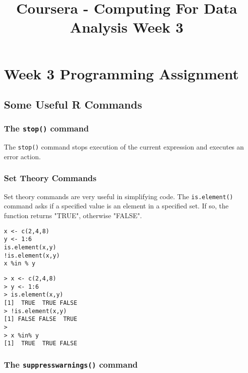 \documentclass[]{article}
\title{Coursera - Computing For Data Analysis Week 3}
\begin{document}
\maketitle



\section{Week 3 Programming Assignment}
\subsection{Some Useful R Commands}

\subsubsection{The \texttt{stop()} command}
The \texttt{stop()} command stops execution of the current expression and executes an error action.

\subsubsection{Set Theory Commands}
Set theory commands are very useful in simplifying code. The \texttt{is.element()} command asks if a specified value is an element in a specified set. If so, the function returns "TRUE", otherwise "FALSE".

\begin{framed}
\begin{verbatim}
x <- c(2,4,8)
y <- 1:6
is.element(x,y)
!is.element(x,y)
x %in % y
\end{verbatim}
\end{framed}

\begin{verbatim}
> x <- c(2,4,8)
> y <- 1:6
> is.element(x,y)
[1]  TRUE  TRUE FALSE
> !is.element(x,y)
[1] FALSE FALSE  TRUE
> 
> x %in% y
[1]  TRUE  TRUE FALSE
\end{verbatim}

\subsubsection{The \texttt{suppresswarnings()} command}
\end{document}
